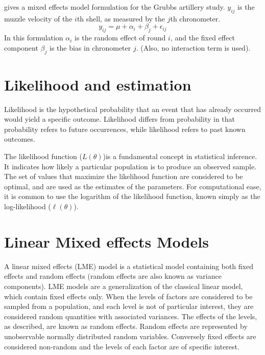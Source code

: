 \documentclass[12pt, a4paper]{report}
\theoremstyle{plain}
\theoremstyle{definition}
\theoremstyle{remark}
\begin{document}
\citet{Searle} gives a mixed effects model formulation for the
Grubbs artillery study. $y_{ij}$ is the muzzle velocity of the
$i$th shell, as measured by the $j$th chronometer.
\begin{equation}
y_{ij} = \mu + \alpha_{i} + \beta_{j}  + \epsilon_{ij}
\end{equation}
In this formulation $\alpha_{i}$ is the random effect of round
$i$, and the fixed effect component $\beta_{j}$ is the bias in
chronometer $j$. (Also, no interaction term is used).




\section{Likelihood and estimation}

 Likelihood is the hypothetical probability that an event that has already occurred would yield a specific outcome. Likelihood differs from probability in that probability refers to future occurrences, while likelihood refers to past known outcomes.

 The likelihood function ($L(\theta)$)is a fundamental concept in statistical inference. It indicates how likely a particular population is to produce an observed sample. The set of values that maximize the likelihood function are considered to be optimal, and are used as the estimates of the parameters. For computational ease, it is common to use the logarithm of the likelihood function, known simply as the log-likelihood ($\ell(\theta)$).


\newpage

	\section{Linear Mixed effects Models}
	A linear mixed effects (LME) model is a statistical model containing both fixed effects and random effects (random effects are also known as variance components). LME models are a generalization of the classical linear model, which contain fixed effects only. When the levels of factors are considered to be sampled from a population,
	and each level is not of particular interest, they are considered random quantities with associated variances.
	The effects of the levels, as described, are known as random effects. Random effects are represented by unobservable
	normally distributed random variables. Conversely fixed effects are considered non-random and the
	levels of each factor are of specific interest.
	
\end{document}
